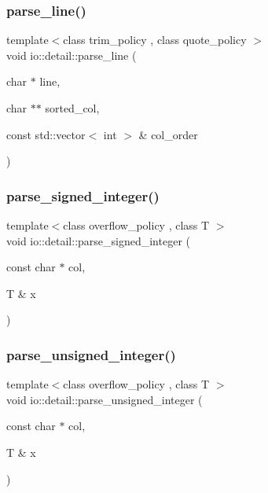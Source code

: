 \subsubsection{\texorpdfstring{parse\+\_\+line()}{parse\_line()}}
{\footnotesize\ttfamily template$<$class trim\+\_\+policy , class quote\+\_\+policy $>$ \\
void io\+::detail\+::parse\+\_\+line (\begin{DoxyParamCaption}\item[{char $\ast$}]{line,  }\item[{char $\ast$$\ast$}]{sorted\+\_\+col,  }\item[{const std\+::vector$<$ int $>$ \&}]{col\+\_\+order }\end{DoxyParamCaption})}

\mbox{\label{namespaceio_1_1detail_abfca68de6bc98a4b80ee15bf6872d9a1}} 
\subsubsection{\texorpdfstring{parse\+\_\+signed\+\_\+integer()}{parse\_signed\_integer()}}
{\footnotesize\ttfamily template$<$class overflow\+\_\+policy , class T $>$ \\
void io\+::detail\+::parse\+\_\+signed\+\_\+integer (\begin{DoxyParamCaption}\item[{const char $\ast$}]{col,  }\item[{T \&}]{x }\end{DoxyParamCaption})}

\mbox{\label{namespaceio_1_1detail_a7e3c24544bc8a152ad2fdcad068cc15d}} 
\subsubsection{\texorpdfstring{parse\+\_\+unsigned\+\_\+integer()}{parse\_unsigned\_integer()}}
{\footnotesize\ttfamily template$<$class overflow\+\_\+policy , class T $>$ \\
void io\+::detail\+::parse\+\_\+unsigned\+\_\+integer (\begin{DoxyParamCaption}\item[{const char $\ast$}]{col,  }\item[{T \&}]{x }\end{DoxyParamCaption})}

